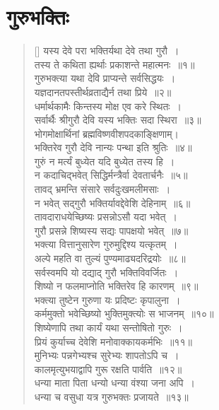 \documentclass[twoside,12pt,notitlepage]{book}
\begin{document}
\section{गुरुभक्तिः}
\begin{verse}[\versewidth]
यस्य देवे परा भक्तिर्यथा  देवे तथा गुरौ~।\\[-6pt]
तस्य ते कथिता ह्यर्थाः प्रकाशन्ते महात्मनः~॥१॥\footA \\
गुरुभक्त्या यथा देवि प्राप्यन्ते सर्वसिद्धयः~।\\[-6pt]
यज्ञदानतपस्तीर्थव्रताद्यैर्न तथा प्रिये~॥२॥\\
धर्मार्थकामैः किन्तस्य मोक्ष एव करे स्थितः~।\\[-6pt]
सर्वार्थैः श्रीगुरौ देवि यस्य भक्तिः सदा स्थिरा~॥३॥\\
भोगमोक्षार्थिनां ब्रह्मविष्णवीशपदकाङ्क्षिणाम्।\\[-6pt]
भक्तिरेव गुरौ देवि नान्यः पन्था इति श्रुतिः~॥४॥\footA \\
गुरुं न मर्त्यं बुध्येत यदि बुध्येत तस्य हि~।\\[-6pt]
न कदाचिद्भवेत् सिद्धिर्मन्त्रैर्वा देवतार्चनैः~॥५॥\\
तावद् भ्रमन्ति संसारे सर्वदुःखमलीमसाः~।\\[-6pt]
न भवेत् सद्गुरौ भक्तिर्यावद्देवेशि देहिनाम्~॥६॥\\
तावदाराधयेच्छिष्यः प्रसन्नोऽसौ यदा भवेत्~।\\[-6pt]
गुरौ प्रसन्ने शिष्यस्य सद्यः पापक्षयो भवेत्~॥७॥\\
भक्त्या वित्तानुसारेण गुरुमुद्दिश्य यत्कृतम्~।\\[-6pt]
अल्पे महति वा तुल्यं पुण्यमाढ्यदरिद्रयोः~॥८॥\\
सर्वस्वमपि यो दद्याद् गुरौ भक्तिविवर्जितः~।\\[-6pt]
शिष्यो न फलमाप्नोति भक्तिरेव हि कारणम्~॥९॥\\
भक्त्या तुष्टेन गुरुणा यः प्रदिष्टः कृपालुना~।\\[-6pt]
कर्ममुक्तो भवेच्छिष्यो भुक्तिमुक्त्योः स भाजनम्~॥१०॥\\
शिष्येणापि तथा कार्यं यथा सन्तोषितो गुरुः~।\\[-6pt]
प्रियं कुर्याच्च देवेशि मनोवाक्कायकर्मभिः~॥११॥\\
मुनिभ्यः पन्नगेभ्यश्च सुरेभ्यः शापतोऽपि च~।\\[-6pt]
कालमृत्युभयाद्वापि गुरू रक्षति पार्वति~॥१२॥\\
धन्या माता पिता धन्यो धन्या वंश्या जना अपि~।\\[-6pt]
धन्या च वसुधा यत्र गुरुभक्तः प्रजायते~॥१३॥\\

\end{verse}
\end{document}
